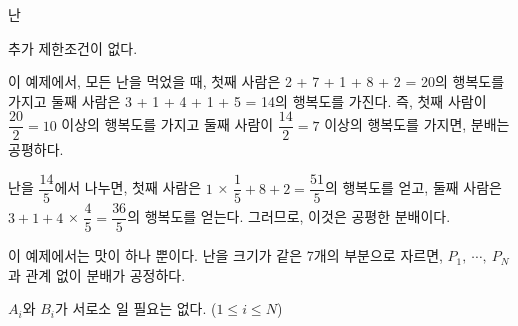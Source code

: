 \begin{problem}{난}
	
	추가 제한조건이 없다.
		
	\Examples
		
	\begin{example}
\end{example}

	이 예제에서, 모든 난을 먹었을 때, 첫째 사람은 2 + 7 + 1 + 8 + 2 = 20의 행복도를 가지고 둘째 사람은 3 + 1 + 4 + 1 + 5 = 14의 행복도를 가진다. 즉, 첫째 사람이 $\dfrac{20}{2} = 10$ 이상의 행복도를 가지고 둘째 사람이 $\dfrac{14}{2} = 7$ 이상의 행복도를 가지면, 분배는 공평하다.
	
	난을 $\dfrac{14}{5}$에서 나누면, 첫째 사람은 $1 $ × $ \dfrac{1}{5} + 8 + 2 = \dfrac{51}{5}$의 행복도를 얻고, 둘째 사람은 $3 + 1 + 4 $ × $ \dfrac{4}{5} = \dfrac{36}{5}$의 행복도를 얻는다. 그러므로, 이것은 공평한 분배이다.
	
	\begin{example}
\end{example}

	이 예제에서는 맛이 하나 뿐이다. 난을 크기가 같은 7개의 부분으로 자르면, $P_1, \ \cdots, \  P_N$과 관계 없이 분배가 공정하다.
	

	\begin{example}
\end{example}

	$A_i$와 $B_i$가 서로소 일 필요는 없다. ($1 \le i \le N$)
	
\end{problem}

